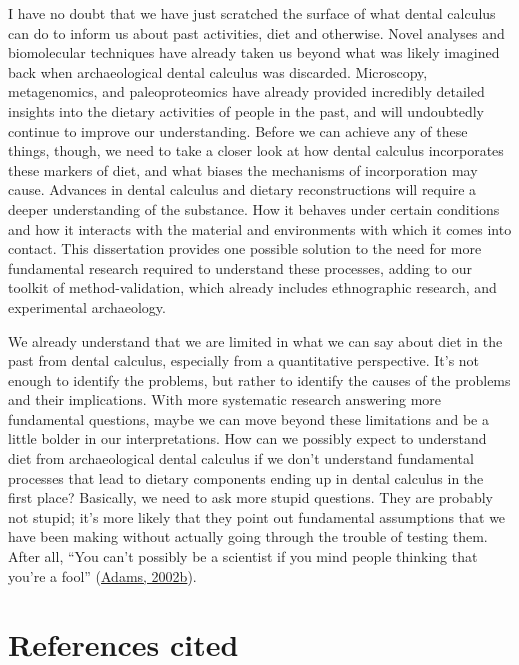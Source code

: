 \documentclass[
  b5paper,
]{book}
\begin{document}
I have no doubt that we have just scratched the surface of what dental
calculus can do to inform us about past activities, diet and otherwise.
Novel analyses and biomolecular techniques have already taken us beyond
what was likely imagined back when archaeological dental calculus was
discarded. Microscopy, metagenomics, and paleoproteomics have already
provided incredibly detailed insights into the dietary activities of
people in the past, and will undoubtedly continue to improve our
understanding. Before we can achieve any of these things, though, we
need to take a closer look at how dental calculus incorporates these
markers of diet, and what biases the mechanisms of incorporation may
cause. Advances in dental calculus and dietary reconstructions will
require a deeper understanding of the substance. How it behaves under
certain conditions and how it interacts with the material and
environments with which it comes into contact. This dissertation
provides one possible solution to the need for more fundamental research
required to understand these processes, adding to our toolkit of
method-validation, which already includes ethnographic research, and
experimental archaeology.

We already understand that we are limited in what we can say about diet
in the past from dental calculus, especially from a quantitative
perspective. It's not enough to identify the problems, but rather to
identify the causes of the problems and their implications. With more
systematic research answering more fundamental questions, maybe we can
move beyond these limitations and be a little bolder in our
interpretations. How can we possibly expect to understand diet from
archaeological dental calculus if we don't understand fundamental
processes that lead to dietary components ending up in dental calculus
in the first place? Basically, we need to ask more stupid questions.
They are probably not stupid; it's more likely that they point out
fundamental assumptions that we have been making without actually going
through the trouble of testing them. After all, ``You can't possibly be
a scientist if you mind people thinking that you're a fool''
(\protect\hyperlink{ref-adamsLongThanks2002}{Adams, 2002b}).

\hypertarget{references-cited-5}{%
\section*{References cited}\label{references-cited-5}}
\end{document}
